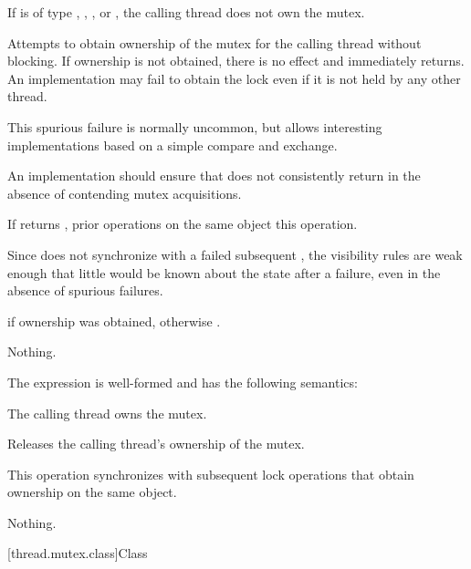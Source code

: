 \begin{itemdescr}
\pnum
\expects
If  is of type , ,
, or , the calling
thread does not own the mutex.

\pnum
\effects
Attempts to obtain ownership of the mutex for the calling thread without
blocking. If ownership is not obtained, there is no effect and 
immediately returns. An implementation may fail to obtain the lock even if it is not
held by any other thread.
\begin{note}
This spurious failure is normally uncommon, but
allows interesting implementations based on a simple
compare and exchange.
\end{note}
An implementation should ensure that  does not consistently return 
in the absence of contending mutex acquisitions.

\pnum
\sync
If  returns , prior  operations
on the same object  this operation.
\begin{note}
Since  does not synchronize with a failed subsequent
, the visibility rules are weak enough that little would be
known about the state after a failure, even in the absence of spurious failures.
\end{note}

\pnum
\result
{}

\pnum
\returns
{} if ownership was obtained, otherwise .

\pnum
\throws
Nothing.
\end{itemdescr}

\pnum
The expression  is well-formed and has the following semantics:

\begin{itemdescr}
\pnum
\expects
The calling thread owns the mutex.

\pnum
\effects
Releases the calling thread's ownership of the mutex.

\pnum
\result
{}

\pnum
\sync
This operation synchronizes with subsequent
lock operations that obtain ownership on the same object.

\pnum
\throws
Nothing.
\end{itemdescr}

[thread.mutex.class]{Class }

